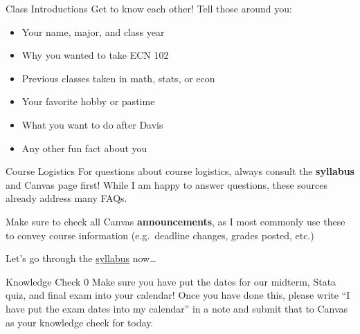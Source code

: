 \documentclass[
  ignorenonframetext,
  english,
]{beamer}
\begin{document}
\begin{frame}{Class Introductions}
\protect{}\label{class-introductions}
Get to know each other! Tell those around you:

\begin{itemize}
\item
  Your name, major, and class year
\item
  Why you wanted to take ECN 102
\item
  Previous classes taken in math, stats, or econ
\item
  Your favorite hobby or pastime
\item
  What you want to do after Davis
\item
  Any other fun fact about you
\end{itemize}
\end{frame}

\begin{frame}{Course Logistics}
\protect{}\label{course-logistics}
For questions about course logistics, always consult the
\textbf{syllabus} and Canvas page first! While I am happy to answer
questions, these sources already address many FAQs.

Make sure to check all Canvas \textbf{announcements}, as I most commonly
use these to convey course information (e.g.~deadline changes, grades
posted, etc.)

\pause

Let's go through the
\href{ECN\%20102\%20Syllabus\%20SS1\%202026.html}{syllabus} now\ldots{}
\end{frame}

\begin{frame}{Knowledge Check 0}
\protect{}\label{knowledge-check-0}
Make sure you have put the dates for our midterm, Stata quiz, and final
exam into your calendar! Once you have done this, please write ``I have
put the exam dates into my calendar'' in a note and submit that to
Canvas as your knowledge check for today.
\end{frame}
\end{document}
